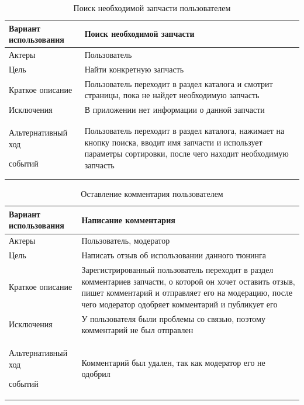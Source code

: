 \documentclass[14pt]{extreport}
\begin{document}
\begin{table}[H]

\begin{center}
\caption{Поиск необходимой запчасти пользователем
 \label{table2}}
\begin{tabular}{|p{5.5cm}|p{10.7cm}|}
\hline
Вариант использования & Поиск необходимой запчасти
 \\
\hline
Актеры
 & Пользователь
 \\
\hline
Цель
 & Найти конкретную запчасть
 \\
\hline
Краткое описание
 & Пользователь переходит в раздел каталога и смотрит страницы, пока не найдет необходимую запчасть
 \\
\hline
Исключения
 &  В приложении нет информации о данной запчасти
 \\
\hline
Альтернативный ход 

событий
& Пользователь переходит в раздел каталога, нажимает на кнопку поиска, вводит имя запчасти и использует параметры сортировки, после чего находит необходимую запчасть
 \\

\hline
\end{tabular}
\end{center}
\end{table}
\begin{table}[H]
\begin{center}
\caption{Оставление комментария пользователем
 \label{table3}}
\begin{tabular}{|p{5.5cm}|p{10.7cm}|}
\hline
Вариант использования & Написание комментария
 \\
\hline
Актеры
 & Пользователь, модератор
 \\
\hline
Цель
 & Написать отзыв об использовании данного тюнинга
 \\
\hline
Краткое описание
 & Зарегистрированный пользователь переходит в раздел комментариев запчасти, о которой он хочет оставить отзыв, пишет комментарий и отправляет его на модерацию, после чего модератор одобряет комментарий и публикует его
 \\
\hline
Исключения
 &  У пользователя были проблемы со связью, поэтому комментарий не был отправлен
 \\
\hline
Альтернативный ход 

событий
&Комментарий был удален, так как модератор его не одобрил
 \\
\hline
\end{tabular}
\end{center}
\end{table}
\end{document}
